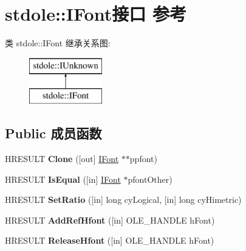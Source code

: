\hypertarget{interfacestdole_1_1_i_font}{}\section{stdole\+:\+:I\+Font接口 参考}
\label{interfacestdole_1_1_i_font}
类 stdole\+:\+:I\+Font 继承关系图\+:\begin{figure}[H]
\begin{center}
\leavevmode
\includegraphics[height=2.000000cm]{interfacestdole_1_1_i_font}
\end{center}
\end{figure}
\subsection*{Public 成员函数}
\begin{DoxyCompactItemize}
\item 
\mbox{\label{interfacestdole_1_1_i_font_a6df6c25e7e19529bff19adf838b50b18}} 
H\+R\+E\+S\+U\+LT {\bfseries Clone} (\mbox{[}out\mbox{]} \hyperlink{interfacestdole_1_1_i_font}{I\+Font} $\ast$$\ast$ppfont)
\item 
\mbox{\label{interfacestdole_1_1_i_font_a67fef8a29e2a6d26fea9b200c62b35bc}} 
H\+R\+E\+S\+U\+LT {\bfseries Is\+Equal} (\mbox{[}in\mbox{]} \hyperlink{interfacestdole_1_1_i_font}{I\+Font} $\ast$pfont\+Other)
\item 
\mbox{\label{interfacestdole_1_1_i_font_a18d289117b92d38f13cef45c0015c1d5}} 
H\+R\+E\+S\+U\+LT {\bfseries Set\+Ratio} (\mbox{[}in\mbox{]} long cy\+Logical, \mbox{[}in\mbox{]} long cy\+Himetric)
\item 
\mbox{\label{interfacestdole_1_1_i_font_ae8bb251a8e53f75f33819efed294ad61}} 
H\+R\+E\+S\+U\+LT {\bfseries Add\+Ref\+Hfont} (\mbox{[}in\mbox{]} O\+L\+E\+\_\+\+H\+A\+N\+D\+LE h\+Font)
\item 
\mbox{\label{interfacestdole_1_1_i_font_a14c201662d5f5369a8d8702a6b235fb5}} 
H\+R\+E\+S\+U\+LT {\bfseries Release\+Hfont} (\mbox{[}in\mbox{]} O\+L\+E\+\_\+\+H\+A\+N\+D\+LE h\+Font)
\end{DoxyCompactItemize}
